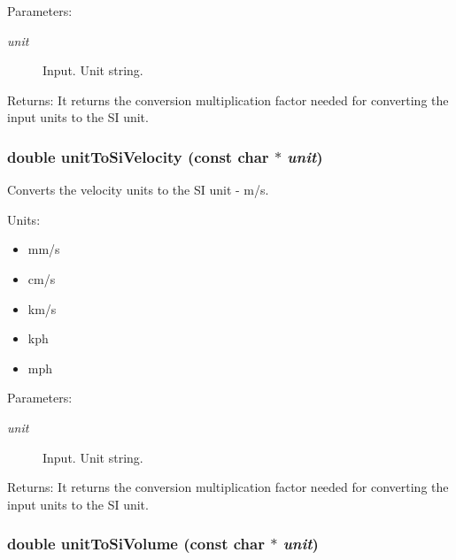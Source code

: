 \begin{Desc}
\item[Parameters:]
\begin{description}
\item[{\em unit}]Input. Unit string.\end{description}
\end{Desc}
\begin{Desc}
\item[Returns:]It returns the conversion multiplication factor needed for converting the input units to the SI unit. \end{Desc}
\hypertarget{group__unit__conv_ge05c76a067cfe4916abf317f00794c63}{
\subsubsection[unitToSiVelocity]{\setlength{\rightskip}{0pt plus 5cm}double unitToSiVelocity (const char $\ast$ {\em unit})}}
\label{group__unit__conv_ge05c76a067cfe4916abf317f00794c63}


Converts the velocity units to the SI unit - m/s. 

Units:\begin{itemize}
\item mm/s\item cm/s\item km/s\item kph\item mph\end{itemize}


\begin{Desc}
\item[Parameters:]
\begin{description}
\item[{\em unit}]Input. Unit string.\end{description}
\end{Desc}
\begin{Desc}
\item[Returns:]It returns the conversion multiplication factor needed for converting the input units to the SI unit. \end{Desc}
\hypertarget{group__unit__conv_g6b53eb2372b6c68e82cda5b9cb4049ea}{
\subsubsection[unitToSiVolume]{\setlength{\rightskip}{0pt plus 5cm}double unitToSiVolume (const char $\ast$ {\em unit})}}
\label{group__unit__conv_g6b53eb2372b6c68e82cda5b9cb4049ea}


